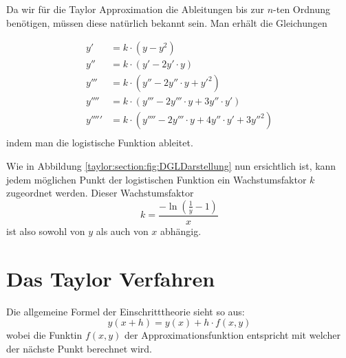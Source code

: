 Da wir für die Taylor Approximation die Ableitungen bis zur $n$-ten Ordnung benötigen, müssen diese natürlich bekannt sein. Man erhält die Gleichungen

\begin{equation}
	\begin{aligned}
		y'&=k\cdot (y-y^{2})\\
		y''&=k\cdot (y'-2y'\cdot y)\\
		y'''&=k\cdot (y''-2y''\cdot y+y'^{2})\\
		y''''&=k\cdot (y'''-2y'''\cdot y+3y''\cdot y')\\
		y'''''&=k\cdot (y''''-2y'''\cdot y+4y''\cdot y'+3y''^{2})\\
	\end{aligned}
\end{equation}
indem man die logistische Funktion ableitet.

Wie in Abbildung \ref{taylor:section:fig:DGLDarstellung} nun ersichtlich ist, kann jedem möglichen Punkt der logistischen Funktion ein Wachstumsfaktor $k$ zugeordnet werden. Dieser Wachstumsfaktor
\begin{equation}
	k=\frac{-\ln{(\frac{1}{y}-1)}}{x}
\end{equation}
ist also sowohl von $y$ als auch von $x$ abhängig.

\section{Das Taylor Verfahren}
\label{taylor:subsection:Vorgehen}
Die allgemeine Formel der Einschritttheorie sieht so aus:
\begin{equation}
y(x+h) = y(x) + h\cdot f(x,y)
\end{equation}
wobei die Funktin $f(x,y)$ der Approximationsfunktion entspricht mit welcher der nächste Punkt berechnet wird.

